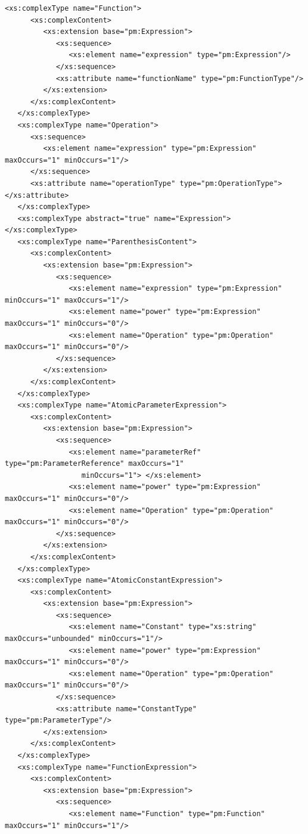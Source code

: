 \documentclass[a4paper,11pt] {ivoa}
\begin{document}
\begin{lstlisting}[style=listXML]
   <xs:complexType name="Function">
      <xs:complexContent>
         <xs:extension base="pm:Expression">
            <xs:sequence>
               <xs:element name="expression" type="pm:Expression"/>
            </xs:sequence>
            <xs:attribute name="functionName" type="pm:FunctionType"/>
         </xs:extension>
      </xs:complexContent>
   </xs:complexType>
   <xs:complexType name="Operation">
      <xs:sequence>
         <xs:element name="expression" type="pm:Expression" maxOccurs="1" minOccurs="1"/>
      </xs:sequence>
      <xs:attribute name="operationType" type="pm:OperationType"> </xs:attribute>
   </xs:complexType>
   <xs:complexType abstract="true" name="Expression"> </xs:complexType>
   <xs:complexType name="ParenthesisContent">
      <xs:complexContent>
         <xs:extension base="pm:Expression">
            <xs:sequence>
               <xs:element name="expression" type="pm:Expression" minOccurs="1" maxOccurs="1"/>
               <xs:element name="power" type="pm:Expression" maxOccurs="1" minOccurs="0"/>
               <xs:element name="Operation" type="pm:Operation" maxOccurs="1" minOccurs="0"/>
            </xs:sequence>
         </xs:extension>
      </xs:complexContent>
   </xs:complexType>
   <xs:complexType name="AtomicParameterExpression">
      <xs:complexContent>
         <xs:extension base="pm:Expression">
            <xs:sequence>
               <xs:element name="parameterRef" type="pm:ParameterReference" maxOccurs="1"
                  minOccurs="1"> </xs:element>
               <xs:element name="power" type="pm:Expression" maxOccurs="1" minOccurs="0"/>
               <xs:element name="Operation" type="pm:Operation" maxOccurs="1" minOccurs="0"/>
            </xs:sequence>
         </xs:extension>
      </xs:complexContent>
   </xs:complexType>
   <xs:complexType name="AtomicConstantExpression">
      <xs:complexContent>
         <xs:extension base="pm:Expression">
            <xs:sequence>
               <xs:element name="Constant" type="xs:string" maxOccurs="unbounded" minOccurs="1"/>
               <xs:element name="power" type="pm:Expression" maxOccurs="1" minOccurs="0"/>
               <xs:element name="Operation" type="pm:Operation" maxOccurs="1" minOccurs="0"/>
            </xs:sequence>
            <xs:attribute name="ConstantType" type="pm:ParameterType"/>
         </xs:extension>
      </xs:complexContent>
   </xs:complexType>
   <xs:complexType name="FunctionExpression">
      <xs:complexContent>
         <xs:extension base="pm:Expression">
            <xs:sequence>
               <xs:element name="Function" type="pm:Function" maxOccurs="1" minOccurs="1"/>

\end{lstlisting}
\end{document}
